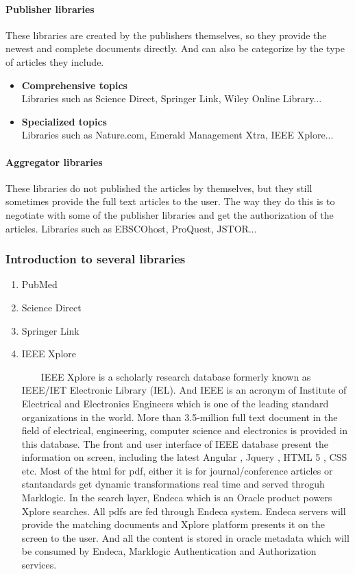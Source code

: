 \paragraph{Publisher libraries}
	These libraries are created by the publishers themselves, so they provide the newest and complete documents directly. And can also be categorize by the type of articles they include.
	\begin{itemize}
		\item\textbf{Comprehensive topics}\\Libraries such as Science Direct, Springer Link, Wiley Online Library...
		\item\textbf{Specialized topics}\\Libraries such as Nature.com, Emerald Management Xtra, IEEE Xplore...
	\end{itemize}
\paragraph{Aggregator libraries}
	These libraries do not published the articles by themselves, but they still sometimes provide the full text articles to the user. The way they do this is to negotiate with some of the publisher libraries and get the authorization of the articles. Libraries such as EBSCOhost, ProQuest, JSTOR...

\subsubsection{Introduction to several libraries }
\begin{enumerate}
	\item {PubMed}
	\item {Science Direct}
	\item {Springer Link}
	\item {IEEE Xplore}
	
	
	~~~~IEEE Xplore is a scholarly research database formerly known as IEEE/IET Electronic Library (IEL). And IEEE is an acronym of Institute of Electrical and Electronics Engineers which is one of the leading standard organizations in the world. More than 3.5-million full text document in the field of electrical, engineering, computer science and electronics is provided in this database. 
	The front and user interface of IEEE database present the information on screen, including the latest Angular , Jquery , HTML 5 , CSS etc. Most of the html for pdf, either it is for journal/conference articles or stantandards get dynamic transformations real time and served throguh Marklogic. In the search layer, Endeca which is an Oracle product powers Xplore searches. All pdfs are fed through Endeca system. Endeca servers will provide the matching documents and Xplore platform presents it on the screen to the user. And all the content is stored in oracle metadata which will be consumed by Endeca, Marklogic Authentication and Authorization services.
	
\end{enumerate}

